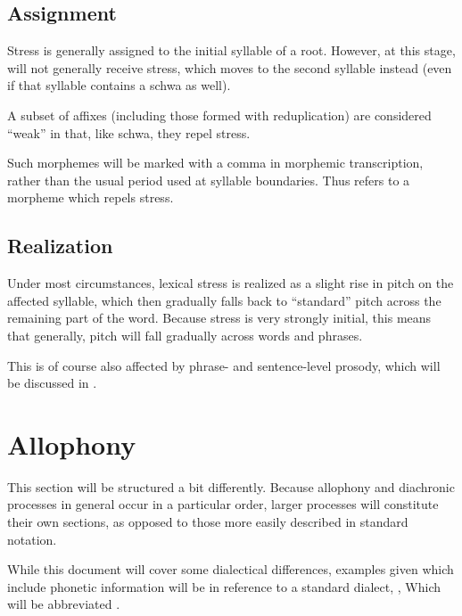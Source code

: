 \subsection{Assignment}\label{sec:phono-stress-assign}
Stress is generally assigned to the initial syllable of a root. However, at this stage,  will not generally receive stress, which moves to the second syllable instead (even if that syllable contains a schwa as well).

A subset of affixes (including those formed with reduplication) are considered ``weak'' in that, like schwa, they repel stress.

Such morphemes will be marked with a comma in morphemic transcription, rather than the usual period used at syllable boundaries. Thus  refers to a morpheme  which repels stress.

\subsection{Realization}
Under most circumstances, lexical stress is realized as a slight rise in pitch on the affected syllable, which then gradually falls back to ``standard'' pitch across the remaining part of the word. Because stress is very strongly initial, this means that generally, pitch will fall gradually across words and phrases.

This is of course also affected by phrase- and sentence-level prosody, which will be discussed in .

\section{Allophony}\label{sec:phono-allo}
This section will be structured a bit differently. Because allophony and diachronic processes in general occur in a particular order, larger processes will constitute their own sections, as opposed to those more easily described in standard notation.

While this document will cover some dialectical differences, examples given which include phonetic information will be in reference to a standard dialect, , Which will be abbreviated .

